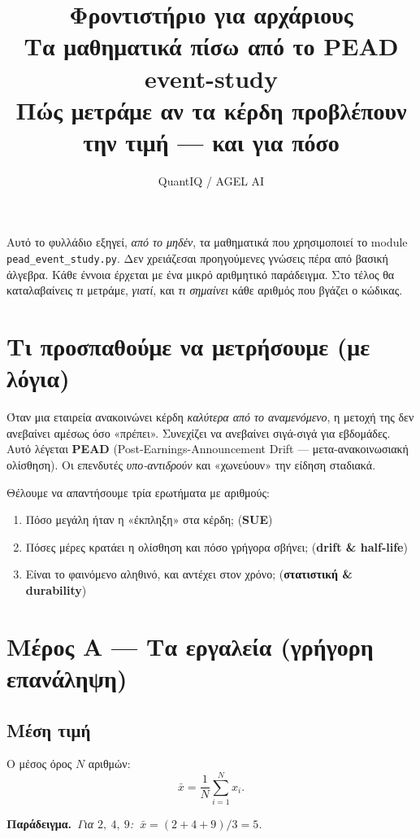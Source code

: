 \documentclass[11pt]{article}
\title{\textbf{Φροντιστήριο για αρχάριους}\\[2pt]
\large Τα μαθηματικά πίσω από το PEAD event-study\\[-2pt]
\normalsize\textcolor{accent}{Πώς μετράμε αν τα κέρδη προβλέπουν την τιμή — και για πόσο}}
\author{QuantIQ / AGEL AI}
\date{}
\newcommand{\ex}[1]{\par\smallskip\noindent\textbf{\textcolor{accent}{Παράδειγμα.}}\ \textit{#1}\par\smallskip}
\begin{document}
\maketitle
\thispagestyle{empty}

\noindent Αυτό το φυλλάδιο εξηγεί, \emph{από το μηδέν}, τα μαθηματικά που χρησιμοποιεί το module
\texttt{pead\_event\_study.py}. Δεν χρειάζεσαι προηγούμενες γνώσεις πέρα από βασική άλγεβρα.
Κάθε έννοια έρχεται με ένα μικρό αριθμητικό παράδειγμα. Στο τέλος θα καταλαβαίνεις
\emph{τι} μετράμε, \emph{γιατί}, και \emph{τι σημαίνει} κάθε αριθμός που βγάζει ο κώδικας.

\tableofcontents
\bigskip

\section{Τι προσπαθούμε να μετρήσουμε (με λόγια)}

Όταν μια εταιρεία ανακοινώνει κέρδη \emph{καλύτερα από το αναμενόμενο}, η μετοχή της δεν
ανεβαίνει αμέσως όσο «πρέπει». Συνεχίζει να ανεβαίνει σιγά-σιγά για εβδομάδες. Αυτό λέγεται
\textbf{PEAD} (Post-Earnings-Announcement Drift — μετα-ανακοινωσιακή ολίσθηση). Οι επενδυτές
\emph{υπο-αντιδρούν} και «χωνεύουν» την είδηση σταδιακά.

Θέλουμε να απαντήσουμε τρία ερωτήματα με αριθμούς:
\begin{enumerate}[leftmargin=2em]
  \item Πόσο μεγάλη ήταν η «έκπληξη» στα κέρδη; \quad(\textbf{SUE})
  \item Πόσες μέρες κρατάει η ολίσθηση και πόσο γρήγορα σβήνει; \quad(\textbf{drift \& half-life})
  \item Είναι το φαινόμενο αληθινό, και αντέχει στον χρόνο; \quad(\textbf{στατιστική \& durability})
\end{enumerate}

\section{Μέρος Α — Τα εργαλεία (γρήγορη επανάληψη)}

\subsection{Μέση τιμή}
Ο μέσος όρος $N$ αριθμών:
\[ \bar{x}=\frac{1}{N}\sum_{i=1}^{N}x_i . \]
\ex{Για $2,\ 4,\ 9$: $\ \bar{x}=(2+4+9)/3=5$.}
\end{document}
